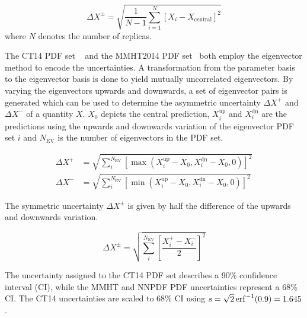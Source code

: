 \begin{equation*}
    \Delta X^{\pm} = \sqrt{\frac{1}{N-1} \sum_{i=1}^N \left[ X_{i} - X_{\mathrm{central}} \right]^2}
\end{equation*}
where $N$ denotes the number of replicas.

The CT14 PDF set ~\cite{Dulat:2015mca} and the MMHT2014 PDF
set~\cite{Harland-Lang:2014zoa} both employ the eigenvector method to encode the
uncertainties. A transformation from the parameter basis to the eigenvector
basis is done to yield mutually uncorrelated eigenvectors. By varying the
eigenvectors upwards and downwards, a set of eigenvector pairs is generated
which can be used to determine the asymmetric uncertainty $\Delta X^+$ and
$\Delta X^-$ of a quantity $X$. $X_0$ depicts the central prediction,
$X_i^{\mathrm{up}}$ and $X_i^{\mathrm{dn}}$ are the predictions using the
upwards and downwards variation of the eigenvector PDF set $i$ and
$N_{\mathrm{EV}}$ is the number of eigenvectors in the PDF set.

\begin{equation*}
\begin{aligned}
    \Delta X^+ &= \sqrt{\sum_i^{N_{\mathrm{EV}}} \left[ \max(X_i^{\mathrm{up}}
    -X_0, X_i^{\mathrm{dn}} - X_0, 0)\right]^2}\\
\Delta X^- &= \sqrt{\sum_i^{N_{\mathrm{EV}}} \left[ \min(X_i^{\mathrm{up}} - X_0, X_i^{\mathrm{dn}} - X_0,0)\right]^2}
\end{aligned}
\end{equation*}

The symmetric uncertainty $\Delta X^{\pm}$ is given by half the difference of the upwards and
downwards variation.

\begin{equation*}
    \Delta X^{\pm} = \sqrt{\sum_i^{N_{\mathrm{EV}}} \left[ \frac{X_i^+ -
    X_i^-}{2} \right]^2}
\end{equation*}

The uncertainty assigned to the CT14 PDF set describes a 90\% confidence
interval (CI), while the MMHT and NNPDF PDF uncertainties represent a 68\% CI.
The CT14 uncertainties are scaled to 68\% CI using $s = \sqrt{2}
\operatorname{erf}^{-1}(0.9) = 1.645$.

